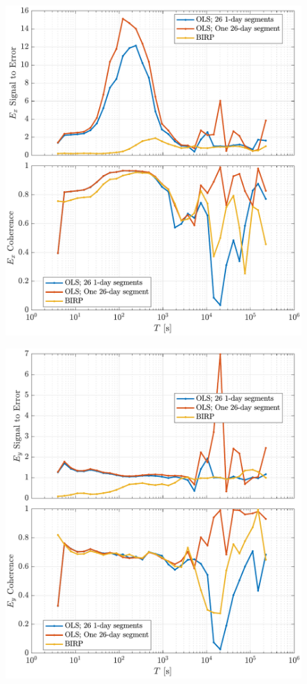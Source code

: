\documentclass{article}
\begin{document}
\begin{figure}[h!]
\centering
\includegraphics[width=\textwidth]{figures/KAP103/SN_compare-E_x.pdf}
\caption{}
\label{fig:universe}
\end{figure}

\begin{figure}[h!]
\centering
\includegraphics[width=\textwidth]{figures/KAP103/SN_compare-E_y.pdf}
\caption{}
\label{fig:universe}
\end{figure}
\end{document}
